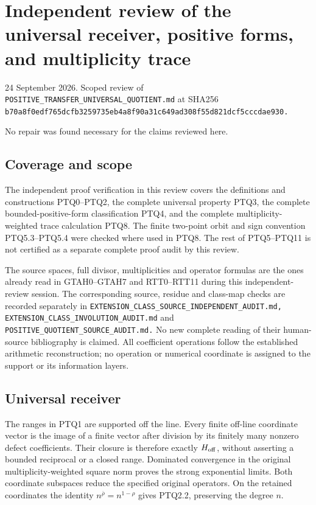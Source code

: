 \section{Independent review of the universal receiver, positive forms,
and multiplicity
trace}\label{independent-review-of-the-universal-receiver-positive-forms-and-multiplicity-trace}

24 September 2026. Scoped review of
\nolinkurl{POSITIVE_TRANSFER_UNIVERSAL_QUOTIENT.md} at SHA256
\nolinkurl{b70a8f0edf765dcfb3259735eb4a8f90a31c649ad308f55d821dcf5cccdae930.}

No repair was found necessary for the claims reviewed here.

\subsection{Coverage and scope}\label{coverage-and-scope}

The independent proof verification in this review covers the definitions
and constructions PTQ0--PTQ2, the complete universal property PTQ3, the
complete bounded-positive-form classification PTQ4, and the complete
multiplicity-weighted trace calculation PTQ8. The finite two-point orbit
and sign convention PTQ5.3--PTQ5.4 were checked where used in PTQ8. The
rest of PTQ5--PTQ11 is not certified as a separate complete proof audit
by this review.

The source spaces, full divisor, multiplicities and operator formulas
are the ones already read in GTAH0--GTAH7 and RTT0--RTT11 during this
independent-review session. The corresponding source, residue and
class-map checks are recorded separately in
\nolinkurl{EXTENSION_CLASS_SOURCE_INDEPENDENT_AUDIT.md,}
\nolinkurl{EXTENSION_CLASS_INVOLUTION_AUDIT.md} and
\nolinkurl{POSITIVE_QUOTIENT_SOURCE_AUDIT.md.} No new complete reading
of their human-source bibliography is claimed. All coefficient
operations follow the established arithmetic reconstruction; no
operation or numerical coordinate is assigned to the support or its
information layers.

\subsection{Universal receiver}\label{universal-receiver}

The ranges in PTQ1 are supported off the line. Every finite off-line
coordinate vector is the image of a finite vector after division by its
finitely many nonzero defect coefficients. Their closure is therefore
exactly \(H_{\rm off}\), without asserting a bounded reciprocal or a
closed range. Dominated convergence in the original
multiplicity-weighted square norm proves the strong exponential limits.
Both coordinate subspaces reduce the specified original operators. On
the retained coordinates the identity \(n^{\overline\rho}=n^{1-\rho}\)
gives PTQ2.2, preserving the degree \(n\).

